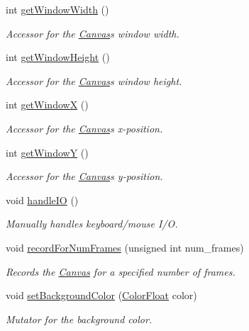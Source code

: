 \begin{DoxyCompactItemize}
int \hyperlink{classtsgl_1_1_canvas_a086a0322f4a6ab27da6929b1aa0593af}{get\+Window\+Width} ()
\begin{DoxyCompactList}\small\item\em Accessor for the \hyperlink{classtsgl_1_1_canvas}{Canvas}\textquotesingle{}s window width. \end{DoxyCompactList}\item 
int \hyperlink{classtsgl_1_1_canvas_ad740ebe5d6bd69ab79cde3e84f369f35}{get\+Window\+Height} ()
\begin{DoxyCompactList}\small\item\em Accessor for the \hyperlink{classtsgl_1_1_canvas}{Canvas}\textquotesingle{}s window height. \end{DoxyCompactList}\item 
int \hyperlink{classtsgl_1_1_canvas_a011ce2354d4565f9d2a323411a47d52d}{get\+Window\+X} ()
\begin{DoxyCompactList}\small\item\em Accessor for the \hyperlink{classtsgl_1_1_canvas}{Canvas}\textquotesingle{}s x-\/position. \end{DoxyCompactList}\item 
int \hyperlink{classtsgl_1_1_canvas_ad6e98d17d3e43d79628a3bd05221ee8b}{get\+Window\+Y} ()
\begin{DoxyCompactList}\small\item\em Accessor for the \hyperlink{classtsgl_1_1_canvas}{Canvas}\textquotesingle{}s y-\/position. \end{DoxyCompactList}\item 
void \hyperlink{classtsgl_1_1_canvas_aa499851e5e4b97bb99ca4fb3d633c17e}{handle\+I\+O} ()
\begin{DoxyCompactList}\small\item\em Manually handles keyboard/mouse I/\+O. \end{DoxyCompactList}\item 
void \hyperlink{classtsgl_1_1_canvas_a47436daa39473ddb4044bac7b3b27151}{record\+For\+Num\+Frames} (unsigned int num\+\_\+frames)
\begin{DoxyCompactList}\small\item\em Records the \hyperlink{classtsgl_1_1_canvas}{Canvas} for a specified number of frames. \end{DoxyCompactList}\item 
void \hyperlink{classtsgl_1_1_canvas_abb668fe42e2fe7f269b255152df959d8}{set\+Background\+Color} (\hyperlink{structtsgl_1_1_color_float}{Color\+Float} color)
\begin{DoxyCompactList}\small\item\em Mutator for the background color. \end{DoxyCompactList}\item 

\end{DoxyCompactItemize}
